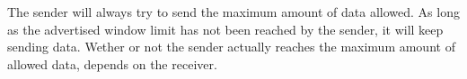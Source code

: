 The sender will always try to send the maximum amount of data allowed. As long as the advertised window limit has not been reached by the sender, it will keep sending data. Wether or not the sender actually reaches the maximum amount of allowed data, depends on the receiver. 
